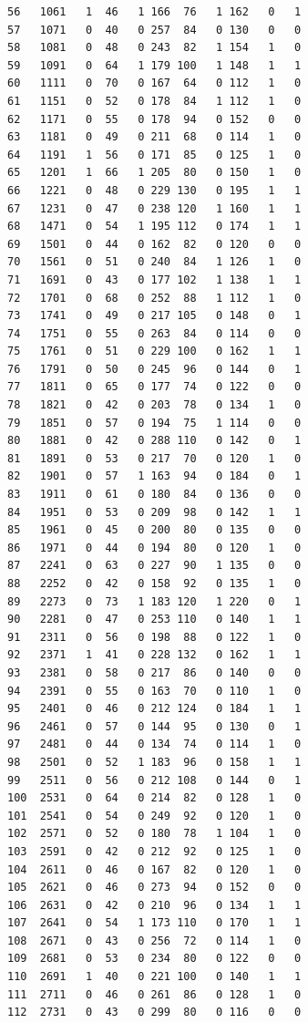 \documentclass[
  letterpaper,
]{scrbook}
\begin{document}
\begin{verbatim}
56   1061   1  46   1 166  76   1 162   0   1
57   1071   0  40   0 257  84   0 130   0   0
58   1081   0  48   0 243  82   1 154   1   0
59   1091   0  64   1 179 100   1 148   1   1
60   1111   0  70   0 167  64   0 112   1   0
61   1151   0  52   0 178  84   1 112   1   0
62   1171   0  55   0 178  94   0 152   0   0
63   1181   0  49   0 211  68   0 114   1   0
64   1191   1  56   0 171  85   0 125   1   0
65   1201   1  66   1 205  80   0 150   1   0
66   1221   0  48   0 229 130   0 195   1   1
67   1231   0  47   0 238 120   1 160   1   1
68   1471   0  54   1 195 112   0 174   1   1
69   1501   0  44   0 162  82   0 120   0   0
70   1561   0  51   0 240  84   1 126   1   0
71   1691   0  43   0 177 102   1 138   1   1
72   1701   0  68   0 252  88   1 112   1   0
73   1741   0  49   0 217 105   0 148   0   1
74   1751   0  55   0 263  84   0 114   0   0
75   1761   0  51   0 229 100   0 162   1   1
76   1791   0  50   0 245  96   0 144   0   1
77   1811   0  65   0 177  74   0 122   0   0
78   1821   0  42   0 203  78   0 134   1   0
79   1851   0  57   0 194  75   1 114   0   0
80   1881   0  42   0 288 110   0 142   0   1
81   1891   0  53   0 217  70   0 120   1   0
82   1901   0  57   1 163  94   0 184   0   1
83   1911   0  61   0 180  84   0 136   0   0
84   1951   0  53   0 209  98   0 142   1   1
85   1961   0  45   0 200  80   0 135   0   0
86   1971   0  44   0 194  80   0 120   1   0
87   2241   0  63   0 227  90   1 135   0   0
88   2252   0  42   0 158  92   0 135   1   0
89   2273   0  73   1 183 120   1 220   0   1
90   2281   0  47   0 253 110   0 140   1   1
91   2311   0  56   0 198  88   0 122   1   0
92   2371   1  41   0 228 132   0 162   1   1
93   2381   0  58   0 217  86   0 140   0   0
94   2391   0  55   0 163  70   0 110   1   0
95   2401   0  46   0 212 124   0 184   1   1
96   2461   0  57   0 144  95   0 130   0   1
97   2481   0  44   0 134  74   0 114   1   0
98   2501   0  52   1 183  96   0 158   1   1
99   2511   0  56   0 212 108   0 144   0   1
100  2531   0  64   0 214  82   0 128   1   0
101  2541   0  54   0 249  92   0 120   1   0
102  2571   0  52   0 180  78   1 104   1   0
103  2591   0  42   0 212  92   0 125   1   0
104  2611   0  46   0 167  82   0 120   1   0
105  2621   0  46   0 273  94   0 152   0   0
106  2631   0  42   0 210  96   0 134   1   1
107  2641   0  54   1 173 110   0 170   1   1
108  2671   0  43   0 256  72   0 114   1   0
109  2681   0  53   0 234  80   0 122   0   0
110  2691   1  40   0 221 100   0 140   1   1
111  2711   0  46   0 261  86   0 128   1   0
112  2731   0  43   0 299  80   0 116   0   0

\end{verbatim}
\end{document}
